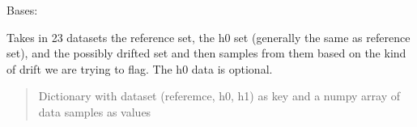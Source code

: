\documentclass[letterpaper,10pt,english]{sphinxmanual}
\begin{document}
\begin{fulllineitems}
\label{\detokenize{baseModules/sampling:sampling.samplingData}}
\pysigstartsignatures
{}
\pysigstopsignatures
\sphinxAtStartPar
Bases: {\hyperref[\detokenize{baseModules/base:base.detectorParent}]{}}

\begin{fulllineitems}
\label{\detokenize{baseModules/sampling:sampling.samplingData.__init__}}
\pysigstartsignatures
{}
\pysigstopsignatures
\sphinxAtStartPar
Takes in 2\sphinxhyphen{}3 datasets \sphinxhyphen{} the reference set, the h0 set (generally the same as reference set),
and the possibly drifted set and then samples from them based on the kind of drift we are
trying to flag. The h0 data is optional.
\begin{quote}\begin{description}
\sphinxAtStartPar
Dictionary with dataset (referemce, h0, h1) as key and a numpy array of data samples as values

\end{description}\end{quote}

\end{fulllineitems}


\begin{fulllineitems}
\label{\detokenize{baseModules/sampling:sampling.samplingData.random_sample}}
\pysigstartsignatures
{}
\pysigstopsignatures
\end{fulllineitems}



\end{fulllineitems}
\end{document}
